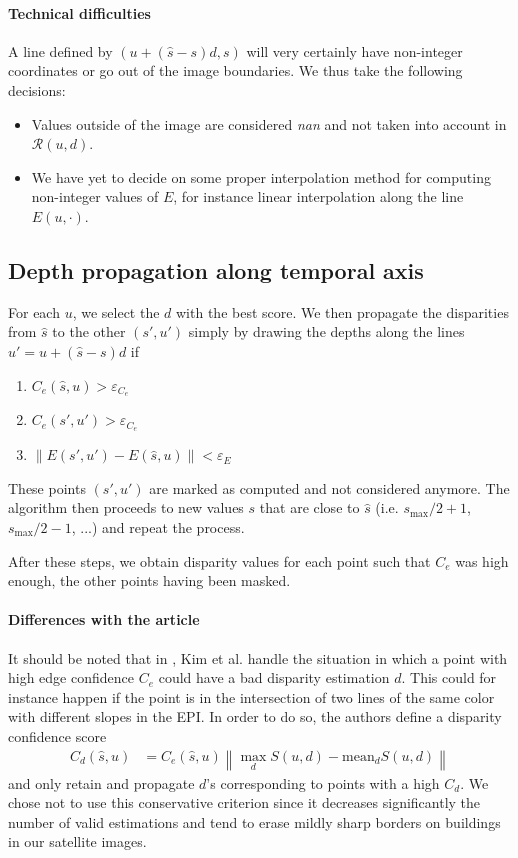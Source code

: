\documentclass{article}
\newcommand{\norm}[1]{\left\lVert#1\right\rVert}
\theoremstyle{definition}
\begin{document}
\paragraph{Technical difficulties} A line defined by $(u + (\widehat{s} - s) d, s)$ will very certainly have non-integer coordinates or go out of the image boundaries. We thus take the following decisions:
\begin{itemize}
 \item Values outside of the image are considered \emph{nan} and not taken into account in $\mathcal{R}(u, d)$.
 \item We have yet to decide on some proper interpolation method for computing non-integer values of $E$, for instance linear interpolation along the line $E(u, \cdot)$.
\end{itemize}


\subsection{Depth propagation along temporal axis}


For each $u$, we select the $d$ with the best score. We then propagate the disparities from $\widehat{s}$ to the other $(s', u')$ simply by drawing the depths along the lines $u' = u + (\widehat{s} - s)d$ if 
\begin{enumerate}
 \item $C_e(\widehat{s}, u) > \varepsilon_{C_e}$
 \item $C_e(s', u') > \varepsilon_{C_e}$
 \item $\norm{E(s', u') - E(\widehat{s}, u)} < \varepsilon_E$
\end{enumerate}
These points $(s', u')$ are marked as computed and not considered anymore. The algorithm then proceeds to new values $s$ that are close to $\widehat{s}$ (i.e. $s_{\max} / 2 + 1$, $s_{\max} / 2 - 1$, ...) and repeat the process.


After these steps, we obtain disparity values for each point such that $C_e$ was high enough, the other points having been masked.


\paragraph{Differences with the article} It should be noted that in \cite{art:kim13:lfields}, Kim et al. handle the situation in which a point with high edge confidence $C_e$ could have a bad disparity estimation $d$. This could for instance happen if the point is in the intersection of two lines of the same color with different slopes in the EPI. In order to do so, the authors define a disparity confidence score
\begin{align}
 C_d (\widehat{s}, u) &= C_e (\widehat{s}, u) \norm{\max_d S(u, d) - \mathrm{mean}_d S(u, d)}
\end{align}
and only retain and propagate $d$'s corresponding to points with a high $C_d$. We chose not to use this conservative criterion since it decreases significantly the number of valid estimations and tend to erase mildly sharp borders on buildings in our satellite images.
\end{document}
